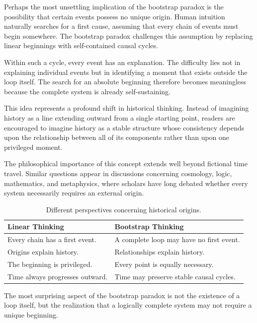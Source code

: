 \documentclass[12pt,oneside,openany]{book}
\begin{document}
Perhaps the most unsettling implication of the bootstrap paradox is the
possibility that certain events possess no unique origin. Human intuition
naturally searches for a first cause, assuming that every chain of events must
begin somewhere. The bootstrap paradox challenges this assumption by replacing
linear beginnings with self-contained causal cycles.

Within such a cycle, every event has an explanation. The difficulty lies not
in explaining individual events but in identifying a moment that exists outside
the loop itself. The search for an absolute beginning therefore becomes
meaningless because the complete system is already self-sustaining.

This idea represents a profound shift in historical thinking. Instead of
imagining history as a line extending outward from a single starting point,
readers are encouraged to imagine history as a stable structure whose
consistency depends upon the relationship between all of its components rather
than upon one privileged moment.

The philosophical importance of this concept extends well beyond fictional time
travel. Similar questions appear in discussions concerning cosmology, logic,
mathematics, and metaphysics, where scholars have long debated whether every
system necessarily requires an external origin.

\begin{table}[H]
\centering
\begin{tabular}{|p{4.4cm}|p{7.6cm}|}
\hline
\textbf{Linear Thinking} & \textbf{Bootstrap Thinking}\\
\hline
Every chain has a first event. & A complete loop may have no first event.\\
\hline
Origins explain history. & Relationships explain history.\\
\hline
The beginning is privileged. & Every point is equally necessary.\\
\hline
Time always progresses outward. & Time may preserve stable causal cycles.\\
\hline
\end{tabular}
\caption{Different perspectives concerning historical origins.}
\end{table}

\begin{tcolorbox}[colback=yellow!8,colframe=orange!70!black,title=Philosophical Reflection]
The most surprising aspect of the bootstrap paradox is not the existence of a
loop itself, but the realization that a logically complete system may not
require a unique beginning.
\end{tcolorbox}
\end{document}
